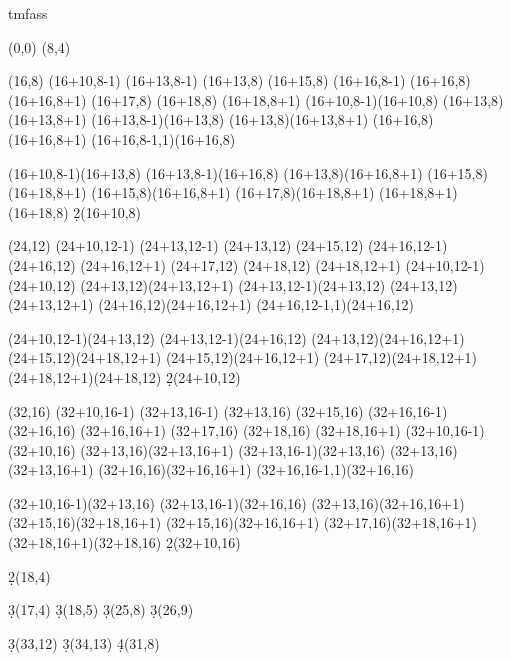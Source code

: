 \documentclass{article}
\begin{document}
\begin{sseqdata}[yscale=0.8, xscale=0.5]{tmfass}
\def\towergroupb(#1,#2){
    \towergroupa(#1,#2)
    \place1(#1+10,#2-1)
    \place1(#1+13,#2-1)
    \place1(#1+13,#2)
    \place1(#1+15,#2)
    \place2(#1+16,#2-1)
    \place1(#1+16,#2)
    \place1(#1+16,#2+1)
    \place1(#1+17,#2)
    \place1(#1+18,#2)
    \place1(#1+18,#2+1)
    \structline(#1+10,#2-1)(#1+10,#2)
    \structline(#1+13,#2)(#1+13,#2+1)
    \structline(#1+13,#2-1)(#1+13,#2)
    \structline(#1+13,#2)(#1+13,#2+1)
    \structline(#1+16,#2)(#1+16,#2+1)
    \structline(#1+16,#2-1,1)(#1+16,#2)

    \structline(#1+10,#2-1)(#1+13,#2)
    \structline(#1+13,#2-1)(#1+16,#2)
    \structline(#1+13,#2)(#1+16,#2+1)
    \structline(#1+15,#2)(#1+18,#2+1)
    \structline(#1+15,#2)(#1+16,#2+1)
    \structline(#1+17,#2)(#1+18,#2+1)
    \structline(#1+18,#2+1)(#1+18,#2)
    \d2(#1+10,#2)

}

\towergroup(0,0)
\towergroupa(8,4)
\towergroupb(16,8)
\towergroupb(24,12)
\towergroupb(32,16)

\d2(18,4)

\d3(17,4)
\d3(18,5)
\d3(25,8)
\d3(26,9)

\d3(33,12)
\d3(34,13)
\d4(31,8)
\end{sseqdata}

\newpage
{}
\newpage
{}
\end{document}
